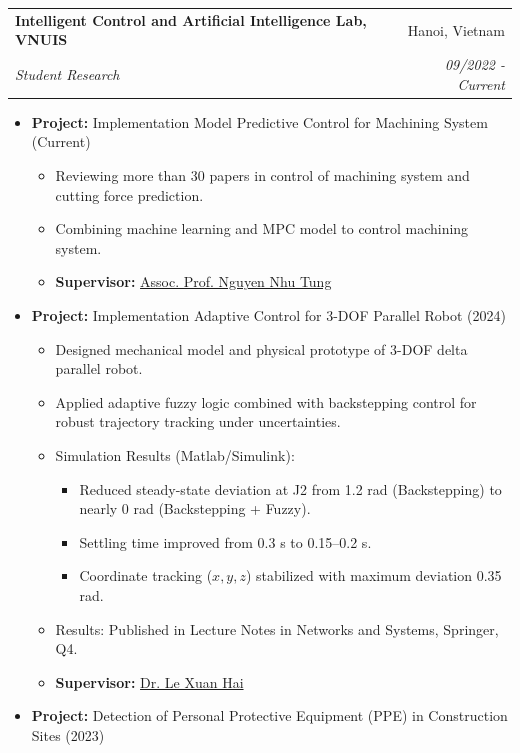 \documentclass[letterpaper,9pt]{extarticle}
\makeatletter
\newcommand{\resumeSubheading}[4]{
  \vspace{-1pt}\item
    \begin{tabular*}{0.97\textwidth}{l@{\extracolsep{\fill}}r}
      \textbf{#1} & #2 \\
      \textit{\small#3} & \textit{\small #4} \\
    \end{tabular*}\vspace{-5pt}
}
\makeatother
\begin{document}
    \resumeSubheading
    {Intelligent Control and Artificial Intelligence Lab, VNUIS}{Hanoi, Vietnam}
    {Student Research}{09/2022 - Current}
    \begin{itemize}
        \item \textbf{Project:} Implementation Model Predictive Control for Machining System (Current)
            \begin{itemize}
                \item Reviewing more than 30 papers in control of machining system and cutting force prediction.
                \item Combining machine learning and MPC model to control machining system.
                \item \textbf{Supervisor:} \href{https://www.is.vnu.edu.vn/en/assoc-prof-phd-nguyen-nhu-tung/}{Assoc. Prof. Nguyen Nhu Tung}
            \end{itemize}
        \item \textbf{Project:} Implementation Adaptive Control for 3-DOF Parallel Robot (2024)
            \begin{itemize}
                \item Designed mechanical model and physical prototype of 3-DOF delta parallel robot.
                \item Applied adaptive fuzzy logic combined with backstepping control for robust trajectory tracking under uncertainties.
                \item Simulation Results (Matlab/Simulink):
                    \begin{itemize}
                        \item Reduced steady-state deviation at J2 from 1.2 rad (Backstepping) to nearly 0 rad (Backstepping + Fuzzy). 
                         \item Settling time improved from 0.3 s to 0.15–0.2 s.
                         \item Coordinate tracking (\(x, y, z\)) stabilized with maximum deviation 0.35 rad.
                    \end{itemize}
                \item Results: Published in Lecture Notes in Networks and Systems, Springer, Q4.
                \item \textbf{Supervisor:} \href{https://www.is.vnu.edu.vn/en/phd-le-xuan-hai/}{Dr. Le Xuan Hai}
            \end{itemize}
        \item \textbf{Project:} Detection of Personal Protective Equipment (PPE) in Construction Sites (2023)

\end{itemize}
\end{document}
